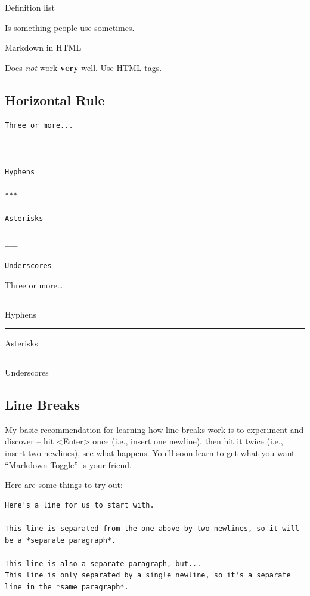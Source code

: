\documentclass[
]{tufte-pandoc}
\begin{document}
Definition list

Is something people use sometimes.

Markdown in HTML

Does \emph{not} work \textbf{very} well. Use HTML tags.

\hypertarget{horizontal-rule}{%
\subsection{Horizontal Rule}\label{horizontal-rule}}

\begin{verbatim}
Three or more...

---

Hyphens

***

Asterisks

___

Underscores
\end{verbatim}

Three or more\ldots{}

\begin{center}\rule{0.5\linewidth}{0.5pt}\end{center}

Hyphens

\begin{center}\rule{0.5\linewidth}{0.5pt}\end{center}

Asterisks

\begin{center}\rule{0.5\linewidth}{0.5pt}\end{center}

Underscores

\hypertarget{line-breaks}{%
\subsection{Line Breaks}\label{line-breaks}}

My basic recommendation for learning how line breaks work is to
experiment and discover -- hit \textless Enter\textgreater{} once (i.e.,
insert one newline), then hit it twice (i.e., insert two newlines), see
what happens. You'll soon learn to get what you want. ``Markdown
Toggle'' is your friend.

Here are some things to try out:

\begin{verbatim}
Here's a line for us to start with.

This line is separated from the one above by two newlines, so it will be a *separate paragraph*.

This line is also a separate paragraph, but...
This line is only separated by a single newline, so it's a separate line in the *same paragraph*.
\end{verbatim}
\end{document}
